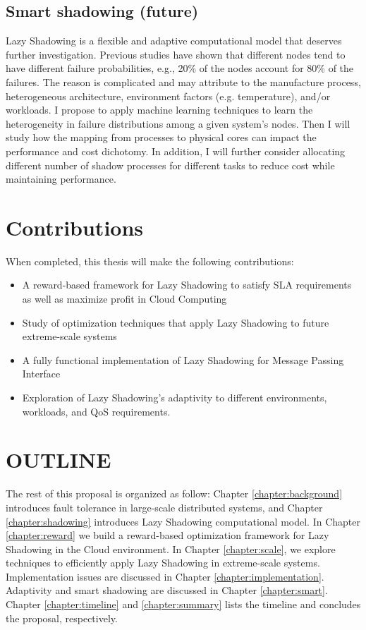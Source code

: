\subsection{Smart shadowing (future)}
Lazy Shadowing is a flexible and adaptive computational model that deserves further investigation. Previous studies have shown that 
different nodes tend to have different failure probabilities, e.g., 20\% of the nodes account for 80\% of the failures. The reason 
is complicated and may attribute to the manufacture process, heterogeneous architecture, environment factors (e.g. temperature), 
and/or workloads. I propose to apply machine learning techniques to learn the heterogeneity in failure distributions among a given 
system's nodes. Then I will study how the mapping from processes to physical cores can impact the performance and cost dichotomy. 
In addition, I will further consider allocating different number of shadow processes for different tasks to reduce cost while 
maintaining performance. 

\section{Contributions}
When completed, this thesis will make the following contributions:

\begin{itemize}
\item A reward-based framework for Lazy Shadowing to satisfy SLA requirements as well as maximize profit in Cloud Computing
\item Study of optimization techniques that apply Lazy Shadowing to future extreme-scale systems
\item A fully functional implementation of Lazy Shadowing for Message Passing Interface
\item Exploration of Lazy Shadowing's adaptivity to different environments, workloads, and QoS requirements. 
\end{itemize}


\section{OUTLINE}
\label{outline}
The rest of this proposal is organized as follow:  
Chapter \ref{chapter:background} introduces fault tolerance in large-scale distributed systems, 
and Chapter \ref{chapter:shadowing} introduces Lazy Shadowing computational model. In Chapter \ref{chapter:reward} we build a reward-based optimization framework for Lazy Shadowing in the Cloud environment.
In Chapter \ref{chapter:scale}, we explore techniques to efficiently apply Lazy Shadowing in extreme-scale systems. 
Implementation issues are discussed in Chapter \ref{chapter:implementation}. Adaptivity and smart shadowing are discussed in Chapter \ref{chapter:smart}.
Chapter \ref{chapter:timeline} and \ref{chapter:summary} lists the timeline and concludes the proposal, respectively.








